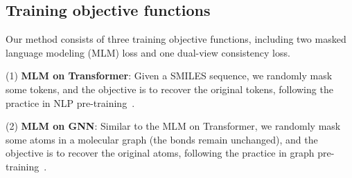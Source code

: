 \documentclass{article}
\begin{document}
\subsection{Training objective functions}
Our method consists of three training objective functions, including two masked language modeling (MLM) loss and one dual-view consistency loss.

\noindent(1) {\bf MLM on Transformer}: Given a SMILES sequence, we randomly mask some tokens, and the objective is to recover  the original tokens, following the practice in NLP pre-training~\cite{devlin2018bert,liu2019roberta}.

\iffalse
After applying random masking to $M_s$, denote the corrupted sequence as $\tilde{M}_s=(\tilde{m}_1,\tilde{m}_2,\cdots,\tilde{m}_l)$. Mathematically, the MLM loss of the Transformer branch is
\begin{equation}
\ell_{s}(\tilde{M}_s;\varphi_s) = \sum_{i=1}^{l}\mathbb{I}\{\tilde{m}_i=\texttt{[mask]}\} \log P(m_i|\tilde{M}_s,\varphi_s),
\end{equation}
where $\mathbb{I}$ is the indicator function.
\fi

\noindent(2) {\bf MLM on GNN}: Similar to the MLM on Transformer, we randomly mask some atoms in a molecular graph (the bonds remain unchanged), and the objective is to recover the original atoms, following the practice in graph pre-training~\cite{hu2019strategies}.
\end{document}
